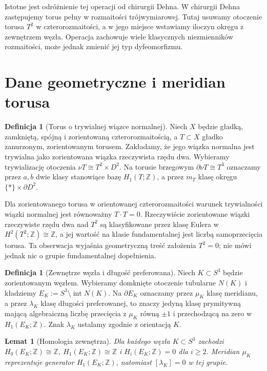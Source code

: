 \documentclass[11pt,a4paper]{report}
\numberwithin{equation}{section}
\theoremstyle{plain}
\newtheorem{lemat}[twierdzenie]{Lemat}
\theoremstyle{definition}
\newtheorem{definicja}[twierdzenie]{Definicja}
\theoremstyle{remark}
\begin{document}
Istotne jest odróżnienie tej operacji od chirurgii Dehna.
W chirurgii Dehna zastępujemy torus pełny w rozmaitości
trójwymiarowej. Tutaj usuwamy otoczenie torusa $T^2$ w
czterorozmaitości, a w jego miejsce wstawiamy iloczyn okręgu
z zewnętrzem węzła. Operacja zachowuje wiele klasycznych
niezmienników rozmaitości, może jednak zmienić jej typ
dyfeomorfizmu.

\section{Dane geometryczne i meridian torusa}
\label{sec:tg-ks-data}

\begin{definicja}[Torus o trywialnej wiązce normalnej]
Niech $X$ będzie gładką, zamkniętą, spójną i zorientowaną
czterorozmaitością, a $T\subset X$ gładko zanurzonym,
zorientowanym torusem. Zakładamy, że jego wiązka normalna
jest trywialna jako zorientowana wiązka rzeczywista
rzędu dwa. Wybieramy trywializację otoczenia
$\nu T\cong T^2\times D^2$. Na torusie brzegowym
$\partial\nu T\cong T^3$ oznaczamy przez $a,b$ dwie
klasy stanowiące bazę $H_1(T;\mathbb Z)$, a przez
$m_T$ klasę okręgu $\{*\}\times\partial D^2$.
\end{definicja}

Dla zorientowanego torusa w orientowanej czterorozmaitości
warunek trywialności wiązki normalnej jest równoważny
$T\cdot T=0$. Rzeczywiście zorientowane wiązki
rzeczywiste rzędu dwa nad $T^2$ są klasyfikowane
przez klasę Eulera w $H^2(T^2;\mathbb Z)\cong\mathbb Z$,
a jej wartość na klasie fundamentalnej jest
liczbą samoprzecięcia torusa. Ta obserwacja
wyjaśnia geometryczną treść założenia $T^2=0$;
nie mówi jednak nic o grupie fundamentalnej dopełnienia.

\begin{definicja}[Zewnętrze węzła i długość preferowana]
Niech $K\subset S^3$ będzie zorientowanym węzłem.
Wybieramy domknięte otoczenie tubularne $N(K)$ i kładziemy
$E_K:=S^3\setminus\operatorname{int}N(K)$.
Na $\partial E_K$ oznaczamy przez $\mu_K$ klasę
meridianu, a przez $\lambda_K$ klasę długości
preferowanej, to znaczy jedyną klasę prymitywną
mającą algebraiczną liczbę przecięcia z $\mu_K$
równą $\pm1$ i przechodzącą na zero w
$H_1(E_K;\mathbb Z)$. Znak $\lambda_K$ ustalamy
zgodnie z orientacją $K$.
\end{definicja}

\begin{lemat}[Homologia zewnętrza]
\label{lem:tg-ks-exterior}
Dla każdego węzła $K\subset S^3$ zachodzi
$H_0(E_K;\mathbb Z)\cong\mathbb Z$,
$H_1(E_K;\mathbb Z)\cong\mathbb Z$ i
$H_i(E_K;\mathbb Z)=0$ dla $i\ge2$.
Meridian $\mu_K$ reprezentuje generator $H_1(E_K;\mathbb Z)$,
natomiast $[\lambda_K]=0$ w tej grupie.
\end{lemat}
\end{document}
